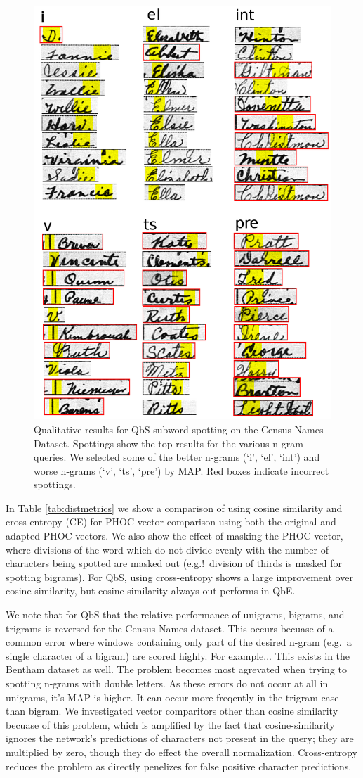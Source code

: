\documentclass[ms,electronic,twosidetoc,letterpaper,chaptercenter,parttop,lof,lot]{byumsphd}
\begin{document}
\begin{figure}
    \centering
    \includegraphics[width=.6\textwidth]{qualSpotNames}
    \caption{Qualitative results for QbS subword spotting on the Census Names Dataset. Spottings show the top results for the various n-gram queries. We selected some of the better n-grams (`i', `el', `int') and worse n-grams (`v', `ts', `pre') by MAP. Red boxes indicate incorrect spottings.
    }
    \label{fig:qualSpotNames}
\end{figure}

In Table \ref{tab:distmetrics} we show a comparison of using cosine similarity and cross-entropy (CE) for PHOC vector comparison using both the original and adapted PHOC vectors. We also show the effect of masking the PHOC vector, where divisions of the word which do not divide evenly with the number of characters being spotted are masked out (e.g.!~division of thirds is masked for spotting bigrams). For QbS, using cross-entropy shows a large improvement over cosine similarity, but cosine similarity always out performs in QbE.

We note that for QbS that the relative performance of unigrams, bigrams, and trigrams is reversed for the Census Names dataset. This occurs becuase of a common error where windows containing only part of the desired n-gram (e.g.~a single character of a bigram) are scored highly. For example...
This exists in the Bentham dataset as well.
The problem becomes most agrevated when trying to spotting n-grams with double letters. As these errors do not occur at all in unigrams, it's MAP is higher. It can occur more freqently in the trigram case than bigram.
We investigated vector comparitors other than cosine similarity becuase of this problem, which is amplified by the fact that cosine-similarity ignores the network's predictions of characters not present in the query; they are multiplied by zero, though they do effect the overall normalization. Cross-entropy reduces the problem as directly penelizes for false positive character predictions.
\end{document}

